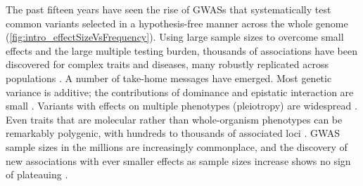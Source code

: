 The past fifteen years have seen the rise of \glspl{GWAS} that systematically test common variants selected in a hypothesis-free manner across the whole genome (\cref{fig:intro_effectSizeVsFrequency}).
Using large sample sizes to overcome small effects and the large multiple testing burden, thousands of associations have been discovered for complex traits and diseases,
many robustly replicated across populations \autocite{visscher2012FiveYearsGWAS,visscher201710YearsGWAS}.
A number of take-home messages have emerged.
%
Most genetic variance is additive; the contributions of dominance and epistatic interaction are small \autocite{visscher2019Fisher1918Paper}.
Variants with effects on multiple phenotypes (pleiotropy) are widespread \autocite{visscher2012FiveYearsGWAS}.
Even traits that are molecular rather than whole-organism phenotypes can be remarkably polygenic, with hundreds to thousands of associated loci \autocite{sinnott-armstrong2020GWASThreeMolecular}.
\Gls{GWAS} sample sizes in the millions are increasingly commonplace,
and the discovery of new associations with ever smaller effects as sample sizes increase shows no sign of plateauing \autocite{tam2019BenefitsLimitationsGenomewide,crouch2020PolygenicInheritanceGWAS}.

